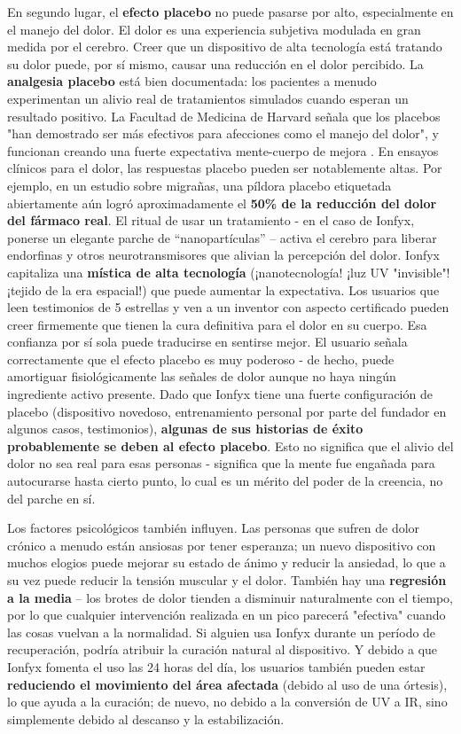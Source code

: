 \documentclass{article}
\begin{document}
En segundo lugar, el \textbf{efecto placebo} no puede pasarse por alto, especialmente en el manejo del dolor. El dolor es una experiencia subjetiva modulada en gran medida por el cerebro. Creer que un dispositivo de alta tecnología está tratando su dolor puede, por sí mismo, causar una reducción en el dolor percibido. La \textbf{analgesia placebo} está bien documentada: los pacientes a menudo experimentan un alivio real de tratamientos simulados cuando esperan un resultado positivo. La Facultad de Medicina de Harvard señala que los placebos "han demostrado ser más efectivos para afecciones como el manejo del dolor", y funcionan creando una fuerte expectativa mente-cuerpo de mejora \cite{harvard_placebo}. En ensayos clínicos para el dolor, las respuestas placebo pueden ser notablemente altas. Por ejemplo, en un estudio sobre migrañas, una píldora placebo etiquetada abiertamente aún logró aproximadamente el \textbf{50\% de la reducción del dolor del fármaco real}. El ritual de usar un tratamiento - en el caso de Ionfyx, ponerse un elegante parche de “nanopartículas” – activa el cerebro para liberar endorfinas y otros neurotransmisores que alivian la percepción del dolor. Ionfyx capitaliza una \textbf{mística de alta tecnología} (¡nanotecnología! ¡luz UV "invisible"! ¡tejido de la era espacial!) que puede aumentar la expectativa. Los usuarios que leen testimonios de 5 estrellas y ven a un inventor con aspecto certificado pueden creer firmemente que tienen la cura definitiva para el dolor en su cuerpo. Esa confianza por sí sola puede traducirse en sentirse mejor. El usuario señala correctamente que el efecto placebo es muy poderoso - de hecho, puede amortiguar fisiológicamente las señales de dolor aunque no haya ningún ingrediente activo presente. Dado que Ionfyx tiene una fuerte configuración de placebo (dispositivo novedoso, entrenamiento personal por parte del fundador en algunos casos, testimonios), \textbf{algunas de sus historias de éxito probablemente se deben al efecto placebo}. Esto no significa que el alivio del dolor no sea real para esas personas - significa que la mente fue engañada para autocurarse hasta cierto punto, lo cual es un mérito del poder de la creencia, no del parche en sí.

Los factores psicológicos también influyen. Las personas que sufren de dolor crónico a menudo están ansiosas por tener esperanza; un nuevo dispositivo con muchos elogios puede mejorar su estado de ánimo y reducir la ansiedad, lo que a su vez puede reducir la tensión muscular y el dolor. También hay una \textbf{regresión a la media} – los brotes de dolor tienden a disminuir naturalmente con el tiempo, por lo que cualquier intervención realizada en un pico parecerá "efectiva" cuando las cosas vuelvan a la normalidad. Si alguien usa Ionfyx durante un período de recuperación, podría atribuir la curación natural al dispositivo. Y debido a que Ionfyx fomenta el uso las 24 horas del día, los usuarios también pueden estar \textbf{reduciendo el movimiento del área afectada} (debido al uso de una órtesis), lo que ayuda a la curación; de nuevo, no debido a la conversión de UV a IR, sino simplemente debido al descanso y la estabilización.
\end{document}
